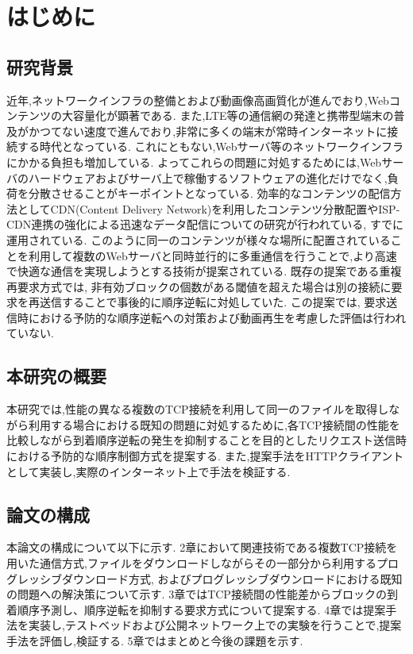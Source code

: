 \documentclass[a4j,12pt]{gradthesis_utf8}
\begin{document}
 
\maketitle %

\chapter{はじめに}\label{sec:sec1}
\section{研究背景}
近年,ネットワークインフラの整備とおよび動画像高画質化が進んでおり,Webコンテンツの大容量化が顕著である.
また,LTE等の通信網の発達と携帯型端末の普及がかつてない速度で進んでおり,非常に多くの端末が常時インターネットに接続する時代となっている.
これにともない,Webサーバ等のネットワークインフラにかかる負担も増加している.
よってこれらの問題に対処するためには,Webサーバのハードウェアおよびサーバ上で稼働するソフトウェアの進化だけでなく,負荷を分散させることがキーポイントとなっている.
効率的なコンテンツの配信方法としてCDN(Content Delivery Network)を利用したコンテンツ分散配置やISP-CDN連携の強化による迅速なデータ配信についての研究が行われている\cite{cdn},
すでに運用されている.
このように同一のコンテンツが様々な場所に配置されていることを利用して複数のWebサーバと同時並行的に多重通信を行うことで,より高速で快適な通信を実現しようとする技術が提案されている.
既存の提案である重複再要求方式では, 
非有効ブロックの個数がある閾値を超えた場合は別の接続に要求を再送信することで事後的に順序逆転に対処していた.
この提案では, 要求送信時における予防的な順序逆転への対策および動画再生を考慮した評価は行われていない.

\section{本研究の概要}
本研究では,性能の異なる複数のTCP接続を利用して同一のファイルを取得しながら利用する場合における既知の問題に対処するために,各TCP接続間の性能を比較しながら到着順序逆転の発生を抑制することを目的としたリクエスト送信時における予防的な順序制御方式を提案する.
また,提案手法をHTTPクライアントとして実装し,実際のインターネット上で手法を検証する.

\section{論文の構成}
本論文の構成について以下に示す.
2章において関連技術である複数TCP接続を用いた通信方式,ファイルをダウンロードしながらその一部分から利用するプログレッシブダウンロード方式, およびプログレッシブダウンロードにおける既知の問題への解決策について示す.
3章ではTCP接続間の性能差からブロックの到着順序予測し、順序逆転を抑制する要求方式について提案する.
4章では提案手法を実装し,テストベッドおよび公開ネットワーク上での実験を行うことで,提案手法を評価し,検証する.
5章ではまとめと今後の課題を示す.
\end{document}
